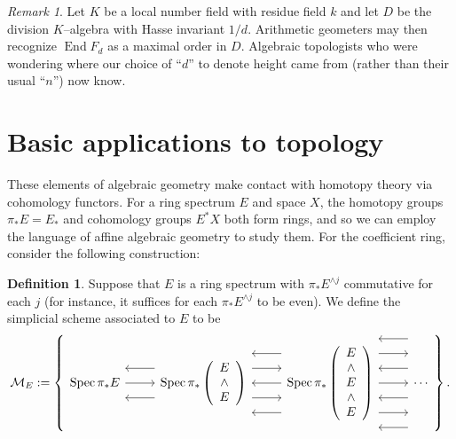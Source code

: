 \documentclass{amsart}
\newcommand{\<}{\langle}
\renewcommand{\>}{\rangle}
\newcommand{\sm}{\wedge}
\DeclareMathOperator{\Spec}{Spec}
\DeclareMathOperator{\End}{End}
\theoremstyle{plain}
\theoremstyle{definition}
\newtheorem*{definition}{Definition}
\theoremstyle{remark}
\newtheorem*{remark}{Remark}
\begin{document}
\begin{remark}
Let $K$ be a local number field with residue field $k$ and let $D$ be the division $K$--algebra with Hasse invariant $1/d$.  Arithmetic geometers may then recognize $\End F_d$ as a maximal order in $D$.  Algebraic topologists who were wondering where our choice of ``$d$'' to denote height came from (rather than their usual ``$n$'') now know.
\end{remark}




\section{Basic applications to topology}\label{BasicApplicationsToTopology}

These elements of algebraic geometry make contact with homotopy theory via cohomology functors.  For a ring spectrum $E$ and space $X$, the homotopy groups $\pi_* E = E_*$ and cohomology groups $E^* X$ both form rings, and so we can employ the language of affine algebraic geometry to study them.  For the coefficient ring, consider the following construction:

\begin{definition}\label{RingSpToStackDefn}
Suppose that $E$ is a ring spectrum with $\pi_* E^{\sm j}$ commutative for each $j$ (for instance, it suffices for each $\pi_* E^{\sm j}$ to be even).  We define the simplicial scheme associated to $E$ to be \[\mathcal{M}_E := \left\{
\begin{tikzcd}
\Spec \pi_* E \arrow{r} \arrow[leftarrow,shift left=\baselineskip]{r} \arrow[leftarrow,shift right=\baselineskip]{r} & \Spec \pi_* \left( \begin{array}{c} E \\ \sm \\ E \end{array} \right) \arrow[leftarrow, shift left=(2*\baselineskip)]{r} \arrow[shift left=\baselineskip]{r} \arrow[leftarrow]{r} \arrow[shift right=\baselineskip]{r} \arrow[leftarrow, shift right=(2*\baselineskip)]{r} & \Spec \pi_* \left( \begin{array}{c} E \\ \sm \\ E \\ \sm \\ E \end{array} \right) \arrow[leftarrow, shift left=(3*\baselineskip)]{r} \arrow[shift left=(2*\baselineskip)]{r} \arrow[leftarrow, shift left=\baselineskip]{r} \arrow{r} \arrow[leftarrow, shift right=\baselineskip]{r} \arrow[shift right=(2*\baselineskip)]{r} \arrow[leftarrow, shift right=(3*\baselineskip)]{r} & \cdots
\end{tikzcd}
\right\}.\]
\end{definition}
\end{document}
